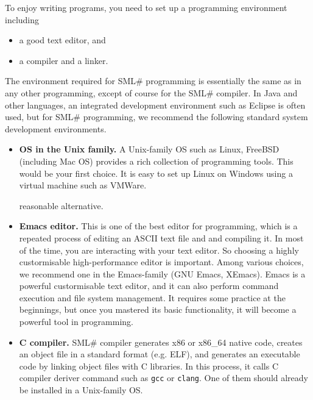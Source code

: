 \documentclass{jbook}
\newcommand{\smlsharp}{SML\#}
\begin{document}
\else%
	To enjoy writing programs, you need to set up a programming
environment including 
\begin{itemize}
\item a good text editor, and
\item a compiler and a linker.
\end{itemize}
	The environment required for \smlsharp{} programming is
essentially the same as in any other programming, except of course for
the \smlsharp{} compiler.
	In Java and other languages, an integrated development
environment such as Eclipse is often used, but for \smlsharp{}
programming, we recommend the following standard system development
environments.

\begin{itemize}
\item {\bf OS in the Unix family.}
	A Unix-family OS such as Linux, FreeBSD (including Mac OS)
provides a rich collection of programming tools.
	This would be your first choice.
	It is easy to set up Linux on Windows using a virtual machine
such as VMWare.

reasonable alternative.
	
\item {\bf Emacs editor.}
	This is one of the best editor for programming, which is a
repeated process of editing an ASCII text file and and compiling it.
	In most of the time, you are interacting with your text editor.
	So choosing a highly custormisable high-performance editor is
important.
	Among various choices, we recommend one in the Emacs-family (GNU
Emacs, XEmacs).
	Emacs is a powerful custormisable text editor, and it can also
perform command execution and file system management.
	It requires some practice at the beginnings, but once you mastered
its basic functionality, it will become a powerful tool in programming.

\item {\bf C compiler.}
	\smlsharp{} compiler generates x86 or x86\_64 native code,
creates an
object file in a standard format (e.g. ELF), and generates an executable
code by linking object files with C libraries.
	In this process, it calls C compiler deriver command such as
{\tt gcc} or {\tt clang}.
	One of them should already be installed in a Unix-family OS.


\end{itemize}
\end{document}
